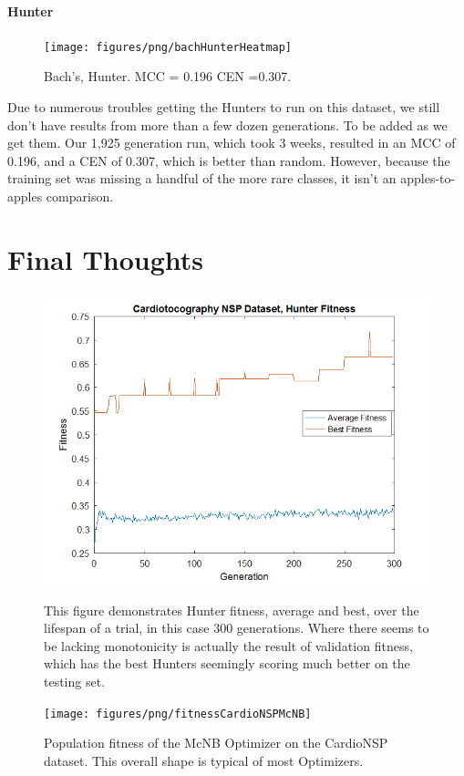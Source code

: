 \paragraph{Hunter}
\begin{figure}
	\centering
	\texttt{[image: figures/png/bachHunterHeatmap]}
	\caption[Bach's Chorales Hunter]{Bach's, Hunter. MCC = 0.196 CEN =0.307.  }
	\label{fig:bachhunter}
	
\end{figure}
Due to numerous troubles getting the Hunters to run on this dataset, we still don't have results from more than a few dozen generations.  To be added as we get them.  Our 1,925 generation run, which took 3 weeks, resulted in an MCC of 0.196, and a CEN of 0.307, which is better than random.  However, because the training set was missing a handful of the more rare classes, it isn't an apples-to-apples comparison.  
\section{Final Thoughts}
\begin{figure}
	\centering
	\includegraphics[width=0.7\linewidth]{figures/png/fitnessCardioNSPHunter}
	\caption[Hunter Population Growth, CardioNSP]{This figure demonstrates Hunter fitness, average and best, over the lifespan of a trial, in this case 300 generations. Where there seems to be lacking monotonicity is actually the result of validation fitness, which has the best Hunters seemingly scoring much better on the testing set.}
	\label{fig:fitnesscardionsphunter}
	
	\texttt{[image: figures/png/fitnessCardioNSPMcNB]}
	\caption[Multiclass Na\"ive Bayes Optimizer Growth, CardioNSP]{
	Population fitness of the McNB Optimizer on the CardioNSP dataset.  This overall shape is typical of most Optimizers.}
	\label{fig:fitnesscardionspmcnb}
\end{figure}

